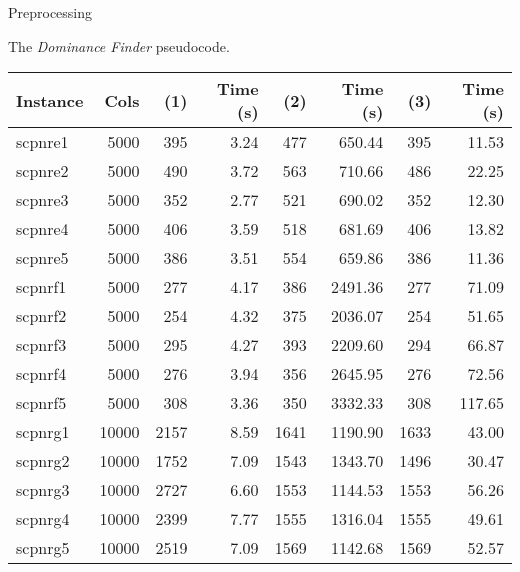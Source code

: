 \documentclass[a4paper,12pt]{mydeitesi_eng}
\begin{document}
\begin{chapter}{Preprocessing}
\begin{algorithm}[h]
\caption{The \emph{Dominance Finder} pseudocode.}
\label{alg:Dominance}
\end{algorithm}

\newpage
\mbox{}

\vspace{3cm}

\begin{table}[H]
\begin{center}
\begin{tabular}{l|r||r|r||r|r||r|r}
\textbf{Instance} & \textbf{Cols} & \textbf{(1)} & \textbf{Time (s)} & \textbf{(2)} & \textbf{Time (s)} & \textbf{(3)} & \textbf{Time (s)} \\
\hline
scpnre1 & 5000 & 395 & 3.24 & 477 & 650.44 & 395 & 11.53 \\
scpnre2 & 5000 & 490 & 3.72 & 563 & 710.66 & 486 & 22.25 \\
scpnre3 & 5000 & 352 & 2.77 & 521 & 690.02 & 352 & 12.30 \\
scpnre4 & 5000 & 406 & 3.59 & 518 & 681.69 & 406 & 13.82 \\
scpnre5 & 5000 & 386 & 3.51 & 554 & 659.86 & 386 & 11.36 \\
\hline

scpnrf1 & 5000 & 277 & 4.17 & 386 & 2491.36 & 277 & 71.09 \\
scpnrf2 & 5000 & 254 & 4.32 & 375 & 2036.07 & 254 & 51.65 \\
scpnrf3 & 5000 & 295 & 4.27 & 393 & 2209.60 & 294 & 66.87 \\
scpnrf4 & 5000 & 276 & 3.94 & 356 & 2645.95 & 276 & 72.56 \\
scpnrf5 & 5000 & 308 & 3.36 & 350 & 3332.33 & 308 & 117.65 \\
\hline

scpnrg1 & 10000 & 2157 & 8.59 & 1641 & 1190.90 & 1633 & 43.00 \\
scpnrg2 & 10000 & 1752 & 7.09 & 1543 & 1343.70 & 1496 & 30.47 \\
scpnrg3 & 10000 & 2727 & 6.60 & 1553 & 1144.53 & 1553 & 56.26 \\
scpnrg4 & 10000 & 2399 & 7.77 & 1555 & 1316.04 & 1555 & 49.61 \\
scpnrg5 & 10000 & 2519 & 7.09 & 1569 & 1142.68 & 1569 & 52.57 \\
\hline


\end{tabular}
\end{center}
\end{table}
\end{chapter}
\end{document}

